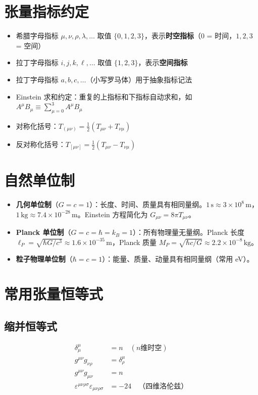 \section{张量指标约定}

\begin{itemize}
    \item 希腊字母指标 $\mu,\nu,\rho,\lambda,\ldots$ 取值 $\{0,1,2,3\}$，表示\textbf{时空指标}（$0$ = 时间，$1,2,3$ = 空间）
    \item 拉丁字母指标 $i,j,k,\ell,\ldots$ 取值 $\{1,2,3\}$，表示\textbf{空间指标}
    \item 拉丁字母指标 $a,b,c,\ldots$（小写罗马体）用于抽象指标记法
    \item Einstein 求和约定：重复的上指标和下指标自动求和，如 $A^\mu B_\mu \equiv \sum_{\mu=0}^3 A^\mu B_\mu$
    \item 对称化括号：$T_{(\mu\nu)} = \frac{1}{2}(T_{\mu\nu} + T_{\nu\mu})$
    \item 反对称化括号：$T_{[\mu\nu]} = \frac{1}{2}(T_{\mu\nu} - T_{\nu\mu})$
\end{itemize}

\section{自然单位制}

\begin{itemize}
    \item \textbf{几何单位制}（$G = c = 1$）：长度、时间、质量具有相同量纲。$1\,\text{s} \approx 3 \times 10^8\,\text{m}$，$1\,\text{kg} \approx 7.4 \times 10^{-28}\,\text{m}$。Einstein 方程简化为 $G_{\mu\nu} = 8\pi T_{\mu\nu}$。
    \item \textbf{Planck 单位制}（$G = c = \hbar = k_B = 1$）：所有物理量无量纲。Planck 长度 $\ell_P = \sqrt{\hbar G / c^3} \approx 1.6 \times 10^{-35}\,\text{m}$，Planck 质量 $M_P = \sqrt{\hbar c / G} \approx 2.2 \times 10^{-8}\,\text{kg}$。
    \item \textbf{粒子物理单位制}（$\hbar = c = 1$）：能量、质量、动量具有相同量纲（常用 eV）。
\end{itemize}

\section{常用张量恒等式}

\subsection{缩并恒等式}
\begin{align}
    \delta^\mu_\mu &= n \quad (n\text{维时空}) \\
    g^{\mu\nu} g_{\nu\rho} &= \delta^\mu_\rho \\
    g^{\mu\nu} g_{\mu\nu} &= n \\
    \varepsilon^{\mu\nu\rho\sigma} \varepsilon_{\mu\nu\rho\sigma} &= -24 \quad \text{（四维洛伦兹）}
\end{align}

